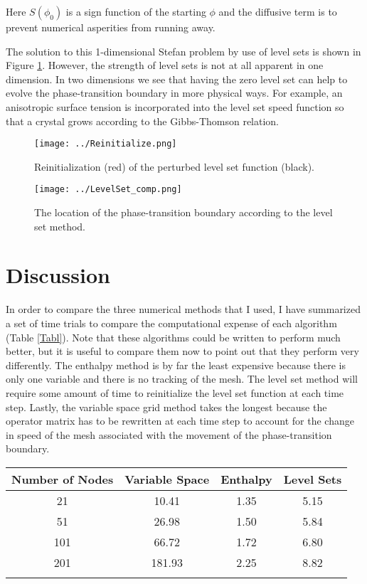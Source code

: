 \documentclass[12pt]{article}
\begin{document}
Here $S(\phi_0)$ is a sign function of the starting $\phi$ and the diffusive term is to prevent numerical asperities from running away.

The solution to this 1-dimensional Stefan problem by use of level sets is shown in Figure \ref{LevSet}. However, the strength of level sets is not at all apparent in one dimension. In two dimensions \citep{Chen1997} we see that having the zero level set can help to evolve the phase-transition boundary in more physical ways. For example, an anisotropic surface tension is incorporated into the level set speed function so that a crystal grows according to the Gibbs-Thomson relation.

\begin{figure}[]
\centering
{}
  \texttt{[image: ../Reinitialize.png]}
  \caption{Reinitialization (red) of the perturbed level set function (black).}
  \label{Reinit}
\endminipage
\hfill
{}
  \texttt{[image: ../LevelSet\_comp.png]}
  \caption{The location of the phase-transition boundary according to the level set method.}
  \label{LevSet}
\endminipage
\end{figure}


\section{Discussion}

In order to compare the three numerical methods that I used, I have summarized a set of time trials to compare the computational expense of each algorithm (Table \ref{Tabl}). Note that these algorithms could be written to perform much better, but it is useful to compare them now to point out that they perform very differently. The enthalpy method is by far the least expensive because there is only one variable and there is no tracking of the mesh. The level set method will require some amount of time to reinitialize the level set function at each time step. Lastly, the variable space grid method takes the longest because the operator matrix has to be rewritten at each time step to account for the change in speed of the mesh associated with the movement of the phase-transition boundary. 

\begin{center}
\vspace{1em}
\begin{tabular}{c c c c}
Number of Nodes &	Variable Space	& Enthalpy & Level Sets \\
\hline
21	&10.41	&1.35	&5.15\\
51	&26.98		&1.50	&5.84\\
101	&66.72		&1.72	&6.80\\
201	&181.93		&2.25	&8.82\\
\label{Tabl}
\end{tabular}
\end{center}
\end{document}
